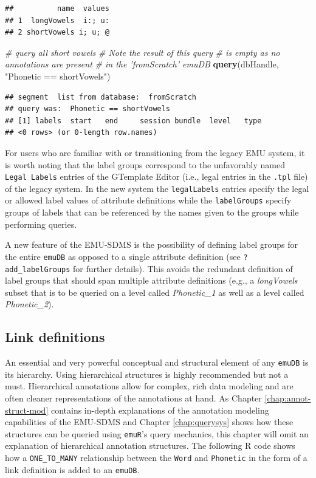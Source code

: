 \documentclass[]{book}
\newenvironment{Shaded}{\begin{snugshade}}{\end{snugshade}}
\newcommand{\CommentTok}[1]{\textcolor[rgb]{0.56,0.35,0.01}{\textit{#1}}}
\newcommand{\KeywordTok}[1]{\textcolor[rgb]{0.13,0.29,0.53}{\textbf{#1}}}
\newcommand{\NormalTok}[1]{#1}
\newcommand{\StringTok}[1]{\textcolor[rgb]{0.31,0.60,0.02}{#1}}
\theoremstyle{definition}
\theoremstyle{definition}
\theoremstyle{definition}
\theoremstyle{remark}
\begin{document}
\begin{verbatim}
##          name  values
## 1  longVowels  i:; u:
## 2 shortVowels i; u; @
\end{verbatim}

\begin{Shaded}
\begin{Highlighting}[]
\CommentTok{# query all short vowels}
\CommentTok{# Note the result of this query}
\CommentTok{# is empty as no annotations are present}
\CommentTok{# in the 'fromScratch' emuDB}
\KeywordTok{query}\NormalTok{(dbHandle, }\StringTok{"Phonetic == shortVowels"}\NormalTok{)}
\end{Highlighting}
\end{Shaded}

\begin{verbatim}
## segment  list from database:  fromScratch 
## query was:  Phonetic == shortVowels 
## [1] labels  start   end     session bundle  level   type   
## <0 rows> (or 0-length row.names)
\end{verbatim}

For users who are familiar with or transitioning from the legacy EMU
system, it is worth noting that the label groups correspond to the
unfavorably named \texttt{Legal\ Labels} entries of the GTemplate Editor
(i.e., legal entries in the \texttt{.tpl} file) of the legacy system. In
the new system the \texttt{legalLabels} entries specify the legal or
allowed label values of attribute definitions while the
\texttt{labelGroups} specify groups of labels that can be referenced by
the names given to the groups while performing queries.

A new feature of the EMU-SDMS is the possibility of defining label
groups for the entire \texttt{emuDB} as opposed to a single attribute
definition (see \texttt{?add\_labelGroups} for further details). This
avoids the redundant definition of label groups that should span
multiple attribute definitions (e.g., a \emph{longVowels} subset that is
to be queried on a level called \emph{Phonetic\_1} as well as a level
called \emph{Phonetic\_2}).

\hypertarget{link-definitions}{%
\subsection{Link definitions}\label{link-definitions}}

An essential and very powerful conceptual and structural element of any
\texttt{emuDB} is its hierarchy. Using hierarchical structures is highly
recommended but not a must. Hierarchical annotations allow for complex,
rich data modeling and are often cleaner representations of the
annotations at hand. As Chapter \ref{chap:annot-struct-mod} contains
in-depth explanations of the annotation modeling capabilities of the
EMU-SDMS and Chapter \ref{chap:querysys} shows how these structures can
be queried using \texttt{emuR}'s query mechanics, this chapter will omit
an explanation of hierarchical annotation structures. The following R
code shows how a \texttt{ONE\_TO\_MANY} relationship between the
\texttt{Word} and \texttt{Phonetic} in the form of a link definition is
added to an \texttt{emuDB}.
\end{document}
